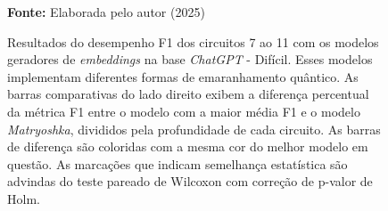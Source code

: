 \begin{figure}
\caption{Resultados do desempenho F1 dos circuitos 7 ao 11 com os modelos geradores de \textit{embeddings} na base \textit{ChatGPT} - Difícil. Esses modelos implementam diferentes formas de emaranhamento quântico. As barras comparativas do lado direito exibem a diferença percentual da métrica F1 entre o modelo com a maior média F1 e o modelo \textit{Matryoshka}, divididos pela profundidade de cada circuito. As barras de diferença são coloridas com a mesma cor do melhor modelo em questão. As marcações que indicam semelhança estatística são advindas do teste pareado de Wilcoxon com correção de p-valor de Holm.}
\label{fig:model_transformer:hard:g2}
     \centering
    \centering

      \par\medskip\ABNTEXfontereduzida\selectfont\textbf{Fonte:} Elaborada pelo autor (2025) \par\medskip
\end{figure}